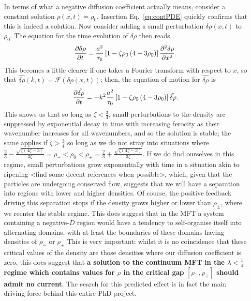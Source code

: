 In terms of what a negative diffusion coefficient actually means, consider a constant solution $\rho(x, t) = \rho_0$. Insertion Eq.~\ref{eq:contPDE} quickly confirms that this is indeed a solution. Now consider adding a small
perturbation $\delta\rho (x, t)$ to $\rho_0$. The equation for the time evolution of $\delta \rho$ then reads
\begin{equation}
 \frac{\partial \delta\rho}{\partial t} = \frac{a^2}{\tau_0} \left[1 - \zeta \rho_0\left(4-3\rho_0\right) \right] \frac{\partial ^2 \delta \rho}{\partial x^2}.
\end{equation}
This becomes a little clearer if one takes a Fourier transform with respect to $x$, so that $\hat{\delta \rho} (k, t) = \mathcal{F}(\delta \rho(x, t))$; then, the equation of motion for $\hat{\delta \rho}$ is
\begin{equation}
 \frac{\partial \hat{\delta \rho}}{\partial t} = - k^2 \frac{a^2}{\tau_0} \left[1 - \zeta \rho_0\left(4-3\rho_0\right) \right] \hat{\delta \rho}.
\end{equation}
This shows us that so long as $\zeta<\frac{3}{4}$, small perturbations to the density are suppressed by exponential decay in time with increasing ferocity as their wavenumber increases for all wavenumbers,
and so the solution is stable; the same applies if $\zeta>\frac{3}{4}$ so long as we do not stray into situations where
$\frac{2}{3} - \frac{\sqrt{\zeta(4\zeta-3)}}{3\zeta} = \rho_- < \rho_0 < \rho_+ = \frac{2}{3} + \frac{\sqrt{\zeta(4\zeta-3)}}{3\zeta}$.
If we do find ourselves in this regime, small perturbations grow exponentially with time in a situation akin to ripening <find some decent references when possible>,
which, given that the particles are undergoing conserved flow, suggests that we will have a separation into regions with lower and higher
densities. Of course, the positive feedback driving this separation stops if the density grows higher or lower than $\rho_\pm$, where we reenter the stable regime. This does suggest that in the MFT a system containing a negative-$D$
region would have a tendency to self-organise itself into alternating domains, with at least the boundaries of these domains having densities of $\rho_-$ or $\rho_+$ This is very important: whilst it is no coincidence that these
critical values of the density are those densities where our diffusion coefficient is zero, this does suggest that \textbf{a solution to the continuum MFT in the $\lambda<\frac{1}{4}$ regime  which contains values for $\rho$
in the critical gap $[\rho_-, \rho_+]$ should admit no current}. The search for this predicted effect is in fact the main driving force behind this entire PhD project.



